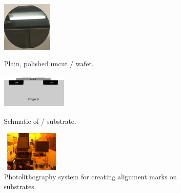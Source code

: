 \begin{figure}[ht]
	\centering
	\begin{minipage}[b]{0.25\linewidth}
		\centering
		\includegraphics[height=2.5cm,width=2.5cm]{figs/experimental/plain_wafer}
		\caption[Plain wafer]{Plain, polished uncut / wafer.}
		\label{fig:plain_wafer}
	\end{minipage}
	\qquad
	\begin{minipage}[b]{0.25\linewidth}
		\centering
		\includegraphics[height=1.75cm,width=3.25cm]{figs/experimental/si_sio2_diagram}
		\caption[Schematic of / substrate]{Schmatic of / substrate.}
		\label{fig:si_sio2_diagram}
	\end{minipage}
	\qquad
	\begin{minipage}[b]{0.25\linewidth}
		\centering
		\includegraphics[height=2cm,width=3cm]{figs/experimental/photolithography_bay}
		\caption[Photolithography system]{Photolithography system for creating alignment marks on substrates.}
		\label{fig:photolithography_bay}
	\end{minipage}
\end{figure}
~
